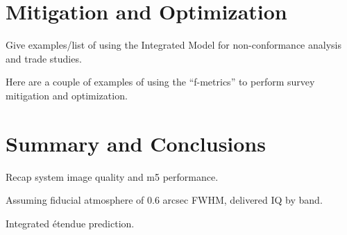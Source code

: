 

\section{Mitigation and Optimization}

Give examples/list of using the Integrated Model for non-conformance analysis and trade studies.

Here are a couple of examples of using the “f-metrics” to perform survey mitigation and optimization.

\section{Summary and Conclusions}

Recap system image quality and m5 performance.

Assuming fiducial atmosphere of 0.6 arcsec FWHM, delivered IQ by band.

Integrated \'etendue prediction.
